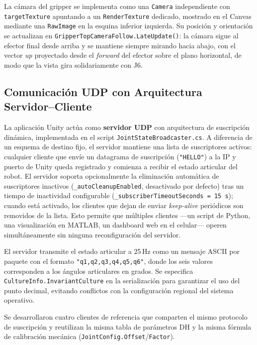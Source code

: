 \documentclass[12pt]{article}
\begin{document}
La cámara del gripper se implementa como una \texttt{Camera} independiente con \texttt{targetTexture} apuntando a un \texttt{RenderTexture} dedicado, mostrado en el Canvas mediante una \texttt{RawImage} en la esquina inferior izquierda. Su posición y orientación se actualizan en \texttt{GripperTopCameraFollow.\allowbreak LateUpdate()}: la cámara sigue al efector final desde arriba y se mantiene siempre mirando hacia abajo, con el vector \textit{up} proyectado desde el \textit{forward} del efector sobre el plano horizontal, de modo que la vista gira solidariamente con J6.

\subsection{Comunicación UDP con Arquitectura Servidor--Cliente}

La aplicación Unity actúa como \textbf{servidor UDP} con arquitectura de suscripción dinámica, implementada en el script \texttt{JointStateBroadcaster.cs}. A diferencia de un esquema de destino fijo, el servidor mantiene una lista de suscriptores activos: cualquier cliente que envíe un datagrama de suscripción (\texttt{"HELLO"}) a la IP y puerto de Unity queda registrado y comienza a recibir el estado articular del robot. El servidor soporta opcionalmente la eliminación automática de suscriptores inactivos (\texttt{\_autoCleanupEnabled}, desactivado por defecto) tras un tiempo de inactividad configurable (\texttt{\_subscriberTimeoutSeconds = 15\,s}); cuando está activado, los clientes que dejan de enviar \textit{keep-alive} periódicos son removidos de la lista. Esto permite que múltiples clientes ---un script de Python, una visualización en MATLAB, un dashboard web en el celular--- operen simultáneamente sin ninguna reconfiguración del servidor.

El servidor transmite el estado articular a 25\,Hz como un mensaje ASCII por paquete con el formato \texttt{"q1,q2,q3,q4,q5,q6"}, donde los seis valores corresponden a los ángulos articulares en grados. Se especifica \texttt{CultureInfo.InvariantCulture} en la serialización para garantizar el uso del punto decimal, evitando conflictos con la configuración regional del sistema operativo.

Se desarrollaron cuatro clientes de referencia que comparten el mismo protocolo de suscripción y reutilizan la misma tabla de parámetros DH y la misma fórmula de calibración mecánica (\texttt{JointConfig.}\allowbreak\texttt{Offset}/\texttt{Factor}).
\end{document}
